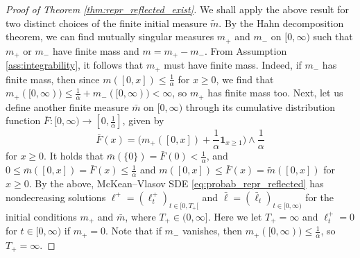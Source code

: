 \documentclass[11pt, a4paper]{article}
\theoremstyle{plain}
\theoremstyle{definition}
\theoremstyle{remark}
\numberwithin{equation}{section}
\newcommand{\define}{\mathpunct{:}}
\renewcommand{\bf}[1]{\mathbf{#1}}
\begin{document}
\begin{proof}[Proof of Theorem \ref{thm:repr_reflected_exist}]
We shall apply the above result for two distinct choices of the finite initial measure $\tilde{m}$. By the Hahn decomposition theorem, we can find mutually singular measures $m_+$ and $m_-$ on $[0, \infty)$ such that $m_+$ or $m_-$ have finite mass and $m = m_+ - m_-$. From Assumption \ref{ass:integrability}, it follows that $m_+$ must have finite mass. Indeed, if $m_-$ has finite mass, then since $m([0, x]) \leq \frac{1}{\alpha}$ for $x \geq 0$, we find that $m_+([0, \infty)) \leq \frac{1}{\alpha} + m_-([0, \infty)) < \infty$, so $m_+$ has finite mass too. Next, let us define another finite measure $\bar{m}$ on $[0, \infty)$ through its cumulative distribution function $\bar{F} \define [0, \infty) \to [0, \frac{1}{\alpha}]$, given by
\begin{equation*}
    \bar{F}(x) = \biggl(m_+([0, x]) + \frac{1}{\alpha}\bf{1}_{x \geq 1}\biggr) \land \frac{1}{\alpha}
\end{equation*}
for $x \geq 0$. It holds that $\bar{m}(\{0\}) = \bar{F}(0) < \frac{1}{\alpha}$, and $0 \leq \bar{m}([0, x]) = \bar{F}(x) \leq \frac{1}{\alpha}$ and $m([0, x]) \leq \bar{F}(x) = \tilde{m}([0, x])$ for $x \geq 0$. By the above, McKean--Vlasov SDE \eqref{eq:probab_repr_reflected} has nondecreasing solutions $\ell^+ = (\ell^+_t)_{t \in [0, T_+[}$ and $\bar{\ell} = (\bar{\ell}_t)_{t \in [0, \infty)}$ for the initial conditions $m_+$ and $\bar{m}$, where $T_+ \in (0, \infty]$. Here we let $T_+ = \infty$ and $\ell^+_t = 0$ for $t \in [0, \infty)$ if $m_+ = 0$. Note that if $m_-$ vanishes, then $m_+([0, \infty)) \leq \frac{1}{\alpha}$, so $T_+ = \infty$.   


\end{proof}
\end{document}

